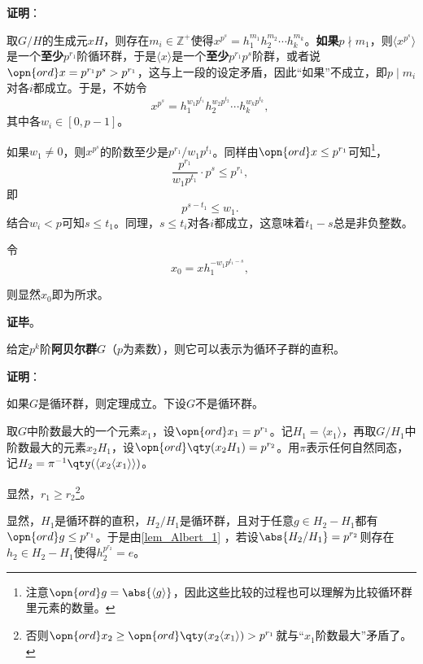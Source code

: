 \textbf{证明}：

取$G/H$的生成元$xH$，则存在$m_i\in \mathbb{Z}^+$使得$x^{p^s}=h_1^{m_1}h_2^{m_2}\cdots h_k^{m_k}$。\textbf{如果}$p\nmid m_1$，则$\langle x^{p^s} \rangle$是一个\textbf{至少}$p^{r_1}$阶循环群，于是$\langle x \rangle$是一个\textbf{至少}$p^{r_1}p^s$阶群，或者说$\opn{ord}x=p^{r_1}p^s>p^{r_1}$，这与上一段的设定矛盾，因此“如果”不成立，即$p\mid m_i$对各$i$都成立。于是，不妨令
\begin{equation}
    x^{p^s}=h_1^{w_1p^{t_1}}h_2^{w_2p^{t_2}}\cdots h_k^{w_kp^{t_k}}, ~
\end{equation}
其中各$w_i\in[0, p-1]$。

如果$w_1\not=0$，则$x^{p^s}$的阶数至少是$p^{r_1}/w_1p^{t_1}$。同样由$\opn{ord}x\leq p^{r_1}$可知\footnote{注意$\opn{ord}g=\abs{\langle g \rangle}$，因此这些比较的过程也可以理解为比较循环群里元素的数量。}，
\begin{equation}
    \frac{p^{r_1}}{w_1p^{t_1}}\cdot p^s\leq p^{r_1}, ~
\end{equation}
即
\begin{equation}
    p^{s-t_1}\leq w_1. ~
\end{equation}
结合$w_i<p$可知$s\leq t_1$。同理，$s\leq t_i$对各$i$都成立，这意味着$t_1-s$总是非负整数。

令
\begin{equation}
    x_0 = x h_1^{-w_1p^{t_1-s}}, ~
\end{equation}

则显然$x_0$即为所求。


\textbf{证毕}。



\begin{theorem}{}
给定$p^k$阶\textbf{阿贝尔群}$G$（$p$为素数），则它可以表示为循环子群的直积。
\end{theorem}


\textbf{证明}：

如果$G$是循环群，则定理成立。下设$G$不是循环群。

取$G$中阶数最大的一个元素$x_1$，设$\opn{ord}x_1=p^{r_1}$。记$H_1=\langle x_1 \rangle$，再取$G/H_1$中阶数最大的元素$x_2H_1$，设$\opn{ord}\qty(x_2H_1) = p^{r_2}$。用$\pi$表示任何自然同态，记$H_2=\pi^{-1}\qty(\langle x_2\langle x_1 \rangle \rangle)$。

显然，$r_1\geq r_2$\footnote{否则$\opn{ord}x_2\geq \opn{ord}\qty(x_2\langle x_1 \rangle)>p^{r_1}$就与“$x_1$阶数最大”矛盾了。}。



显然，$H_1$是循环群的直积，$H_2/H_1$是循环群，且对于任意$g\in H_2-H_1$都有$\opn{ord}g\leq p^{r_1}$。于是由\autoref{lem_Albert_1} ，若设$\abs{H_2/H_1}=p^{r_2}$则存在$h_2\in H_2-H_1$使得$h_2^{p^{r_2}}=e$。


